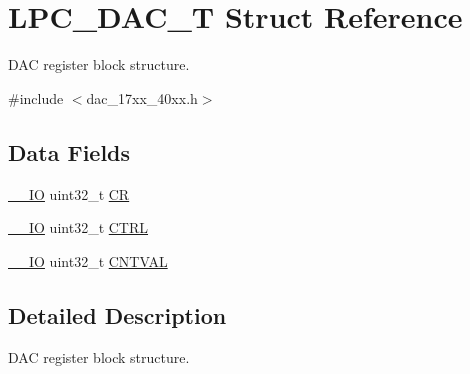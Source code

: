 \hypertarget{structLPC__DAC__T}{\section{L\-P\-C\-\_\-\-D\-A\-C\-\_\-\-T Struct Reference}
\label{structLPC__DAC__T}
}


D\-A\-C register block structure.  




{\ttfamily \#include $<$dac\-\_\-17xx\-\_\-40xx.\-h$>$}

\subsection*{Data Fields}
\begin{DoxyCompactItemize}
\item 
\hyperlink{core__cm3_8h_aec43007d9998a0a0e01faede4133d6be}{\-\_\-\-\_\-\-I\-O} uint32\-\_\-t \hyperlink{structLPC__DAC__T_a9e9bbab757da4f3ef793da168224eb9d}{C\-R}
\item 
\hyperlink{core__cm3_8h_aec43007d9998a0a0e01faede4133d6be}{\-\_\-\-\_\-\-I\-O} uint32\-\_\-t \hyperlink{structLPC__DAC__T_a602c1a7a50c8372683c0eef978e2c149}{C\-T\-R\-L}
\item 
\hyperlink{core__cm3_8h_aec43007d9998a0a0e01faede4133d6be}{\-\_\-\-\_\-\-I\-O} uint32\-\_\-t \hyperlink{structLPC__DAC__T_adfd515a77f5d9e0e7ca6b6835a996c47}{C\-N\-T\-V\-A\-L}
\end{DoxyCompactItemize}


\subsection{Detailed Description}
D\-A\-C register block structure. 

